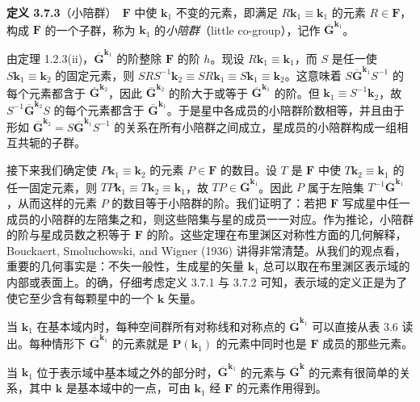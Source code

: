 \noindent\textbf{定义 3.7.3}\quad （小陪群）\ $\mathbf{F}$ 中使 $\mathbf{k}_{1}$ 不变的元素，即满足 $R\mathbf{k}_{1} \equiv \mathbf{k}_{1}$ 的元素 $R \in \mathbf{F}$，构成 $\mathbf{F}$ 的一个子群，称为 $\mathbf{k}_{1}$ 的\textit{小陪群}（little co-group），记作 $\overline{\mathbf{G}}^{\mathbf{k}_{1}}$。

由定理 1.2.3(ii)，$\overline{\mathbf{G}}^{\mathbf{k}_{1}}$ 的阶整除 $\mathbf{F}$ 的阶 $h$。现设 $R\mathbf{k}_{1} \equiv \mathbf{k}_{1}$，而 $S$ 是任一使 $S\mathbf{k}_{1} \equiv \mathbf{k}_{2}$ 的固定元素，则 $SRS^{-1}\mathbf{k}_{2} \equiv SR\mathbf{k}_{1} \equiv S\mathbf{k}_{1} \equiv \mathbf{k}_{2}$。这意味着 $S\overline{\mathbf{G}}^{\mathbf{k}_{1}}S^{-1}$ 的每个元素都含于 $\overline{\mathbf{G}}^{\mathbf{k}_{2}}$，因此 $\overline{\mathbf{G}}^{\mathbf{k}_{2}}$ 的阶大于或等于 $\overline{\mathbf{G}}^{\mathbf{k}_{1}}$ 的阶。但 $\mathbf{k}_{1} \equiv S^{-1}\mathbf{k}_{2}$，故 $S^{-1}\overline{\mathbf{G}}^{\mathbf{k}_{2}}S$ 的每个元素都含于 $\overline{\mathbf{G}}^{\mathbf{k}_{1}}$。于是星中各成员的小陪群阶数相等，并且由于形如 $\overline{\mathbf{G}}^{\mathbf{k}_{2}} = S\overline{\mathbf{G}}^{\mathbf{k}_{1}}S^{-1}$ 的关系在所有小陪群之间成立，星成员的小陪群构成一组相互共轭的子群。

接下来我们确定使 $P\mathbf{k}_{1} \equiv \mathbf{k}_{2}$ 的元素 $P \in \mathbf{F}$ 的数目。设 $T$ 是 $\mathbf{F}$ 中使 $T\mathbf{k}_{2} \equiv \mathbf{k}_{1}$ 的任一固定元素，则 $TP\mathbf{k}_{1} \equiv T\mathbf{k}_{2} \equiv \mathbf{k}_{1}$，故 $TP \in \overline{\mathbf{G}}^{\mathbf{k}_{1}}$。因此 $P$ 属于左陪集 $T^{-1}\overline{\mathbf{G}}^{\mathbf{k}_{1}}$，从而这样的元素 $P$ 的数目等于小陪群的阶。我们证明了：若把 $\mathbf{F}$ 写成星中任一成员的小陪群的左陪集之和，则这些陪集与星的成员一一对应。作为推论，小陪群的阶与星成员数之积等于 $\mathbf{F}$ 的阶。这些定理在布里渊区对称性方面的几何解释，Bouckaert, Smoluchowski, and Wigner (1936) 讲得非常清楚。从我们的观点看，重要的几何事实是：不失一般性，生成星的矢量 $\mathbf{k}_{1}$ 总可以取在布里渊区表示域的内部或表面上。的确，仔细考虑定义 3.7.1 与 3.7.2 可知，表示域的定义正是为了使它至少含有每颗星中的一个 $\mathbf{k}$ 矢量。

当 $\mathbf{k}_{1}$ 在基本域内时，每种空间群所有对称线和对称点的 $\overline{\mathbf{G}}^{\mathbf{k}_{1}}$ 可以直接从表 3.6 读出。每种情形下 $\overline{\mathbf{G}}^{\mathbf{k}_{1}}$ 的元素就是 $\mathbf{P}(\mathbf{k}_{1})$ 的元素中同时也是 $\mathbf{F}$ 成员的那些元素。

当 $\mathbf{k}_{1}$ 位于表示域中基本域之外的部分时，$\overline{\mathbf{G}}^{\mathbf{k}_{1}}$ 的元素与 $\overline{\mathbf{G}}^{\mathbf{k}}$ 的元素有很简单的关系，其中 $\mathbf{k}$ 是基本域中的一点，可由 $\mathbf{k}_{1}$ 经 $\mathbf{F}$ 的元素作用得到。

